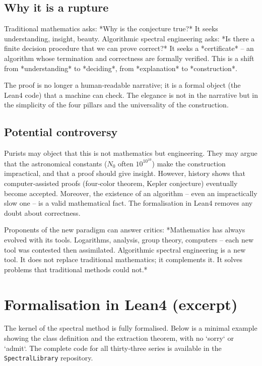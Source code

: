 \documentclass[11pt,a4paper]{article}
\begin{document}
\subsection{Why it is a rupture}

Traditional mathematics asks: *Why is the conjecture true?* It seeks understanding, insight, beauty. Algorithmic spectral engineering asks: *Is there a finite decision procedure that we can prove correct?* It seeks a *certificate* – an algorithm whose termination and correctness are formally verified. This is a shift from *understanding* to *deciding*, from *explanation* to *construction*.

The proof is no longer a human‑readable narrative; it is a formal object (the Lean4 code) that a machine can check. The elegance is not in the narrative but in the simplicity of the four pillars and the universality of the construction.

\subsection{Potential controversy}

Purists may object that this is not mathematics but engineering. They may argue that the astronomical constants (\(N_0\) often \(10^{10^{10}}\)) make the construction impractical, and that a proof should give insight. However, history shows that computer‑assisted proofs (four‑color theorem, Kepler conjecture) eventually become accepted. Moreover, the existence of an algorithm – even an impractically slow one – is a valid mathematical fact. The formalisation in Lean4 removes any doubt about correctness.

Proponents of the new paradigm can answer critics: *Mathematics has always evolved with its tools. Logarithms, analysis, group theory, computers – each new tool was contested then assimilated. Algorithmic spectral engineering is a new tool. It does not replace traditional mathematics; it complements it. It solves problems that traditional methods could not.*

\section{Formalisation in Lean4 (excerpt)}

The kernel of the spectral method is fully formalised. Below is a minimal example showing the class definition and the extraction theorem, with no `sorry` or `admit`. The complete code for all thirty‑three series is available in the \texttt{SpectralLibrary} repository.
\end{document}
